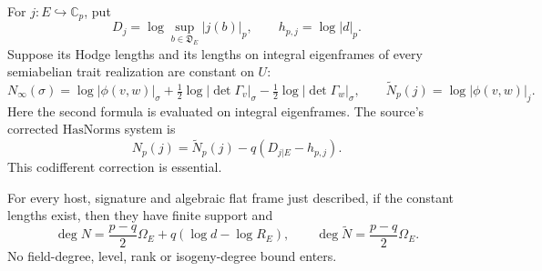 For \(j:E\hookrightarrow\mathbb C_p\), put
\[
 D_j=\log\sup_{b\in\mathfrak D_E}|j(b)|_p,\qquad
                         h_{p,j}=\log|d|_p .
 \tag{FD6}
\]
Suppose its Hodge lengths and its lengths on integral eigenframes
of every semiabelian trait realization are constant on \(U\):
\[
 N_\infty(\sigma)=\log|\phi(v,w)|_\sigma
       +\tfrac12\log|\det\Gamma_v|_\sigma
       -\tfrac12\log|\det\Gamma_w|_\sigma,\qquad
 \widetilde N_p(j)=\log|\phi(v,w)|_j .
 \tag{FD7}
\]
Here the second formula is evaluated on integral eigenframes.
The source's corrected \(\mathrm{HasNorms}\) system is
\[
                    N_p(j)=\widetilde N_p(j)
                                        -q(D_{j|E}-h_{p,j}).
 \tag{FD8}
\]
This codifferent correction is essential.

\begin{srproposition}
\label{prop:sr-general-flat-degree}
For every host, signature and algebraic flat frame just described,
if the constant lengths exist, then they have finite support and
\[
 \deg N=\frac{p-q}{2}\Omega_E+q(\log d-\log R_E),\qquad
                  \deg\widetilde N=\frac{p-q}{2}\Omega_E .
 \tag{FD9}
\]
No field-degree, level, rank or isogeny-degree bound enters.
\end{srproposition}
